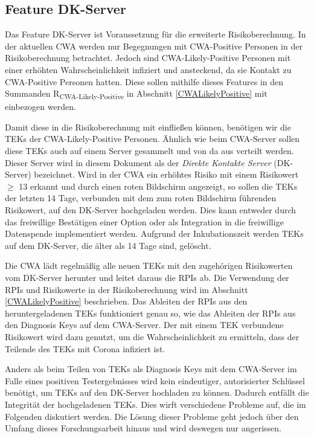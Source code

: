 \documentclass[conference,compsoc]{IEEEtran}
\begin{document}
\subsection{Feature DK-Server}
\label{DK-Server}

Das Feature DK-Server ist Voraussetzung für die erweiterte Risikoberechnung.
In der aktuellen CWA werden nur Begegnungen mit CWA-Positive Personen in der Risikoberechnung betrachtet.
Jedoch sind CWA-Likely-Positive Personen mit einer erhöhten Wahrscheinlichkeit infiziert und ansteckend, da sie Kontakt zu CWA-Positive Personen hatten.
Diese sollen mithilfe dieses Features in den Summanden R\textsubscript{CWA-Likely-Positive} in Abschnitt \ref{CWALikelyPositive} mit einbezogen werden.

Damit diese in die Risikoberechnung mit einfließen können, benötigen wir die TEKs der CWA-Likely-Positive Personen.
Ähnlich wie beim CWA-Server sollen diese TEKs auch auf einem Server gesammelt und von da aus verteilt werden.
Dieser Server wird in diesem Dokument als der \textit{Direkte Kontakte Server} (DK-Server) bezeichnet.
Wird in der CWA ein erhöhtes Risiko mit einem Risikowert $\geq$ 13 erkannt und durch einen roten Bildschirm angezeigt, 
so sollen die TEKs der letzten 14 Tage, verbunden mit dem zum roten Bildschirm führenden Risikowert, auf den DK-Server hochgeladen werden.
Dies kann entweder durch das freiwillige Bestätigen einer Option oder als Integration in die freiwillige Datenspende implementiert werden.
Aufgrund der Inkubationszeit werden TEKs auf dem DK-Server, die älter als 14 Tage sind, gelöscht.

Die CWA lädt regelmäßig alle neuen TEKs mit den zugehörigen Risikowerten vom DK-Server herunter und leitet daraus die RPIs ab.
Die Verwendung der RPIs und Risikowerte in der Risikoberechnung wird im Abschnitt \ref{CWALikelyPositive} beschrieben.
Das Ableiten der RPIs aus den heruntergeladenen TEKs funktioniert genau so, wie das Ableiten der RPIs aus den Diagnosis Keys auf dem CWA-Server.
Der mit einem TEK verbundene Risikowert wird dazu genutzt, um die Wahrscheinlichkeit zu ermitteln, dass der Teilende des TEKs mit Corona infiziert ist.

Anders als beim Teilen von TEKs als Diagnosis Keys mit dem CWA-Server im Falle eines positiven Testergebnisses wird kein eindeutiger, 
autorisierter Schlüssel benötigt, um TEKs auf den DK-Server hochladen zu können.
Dadurch entfällt die Integrität der hochgeladenen TEKs.
Dies wirft verschiedene Probleme auf, die im Folgenden diskutiert werden. 
Die Lösung dieser Probleme geht jedoch über den Umfang dieses Forschungsarbeit hinaus und wird deswegen nur angerissen.
\end{document}
